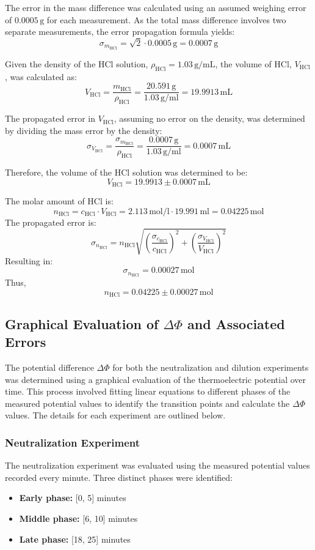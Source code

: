 \documentclass[a4paper,12pt]{article}
\begin{document}
The error in the mass difference was calculated using an assumed weighing error of \(0.0005 \, \text{g}\) for each measurement. As the total mass difference involves two separate measurements, the error propagation formula yields:
\[
\sigma_{m_{\text{HCl}}} = \sqrt{2} \cdot 0.0005 \, \text{g} = 0.0007 \, \text{g}
\]

Given the density of the HCl solution, \( \rho_{\text{HCl}} = 1.03 \, \text{g/mL} \), the volume of HCl, \( V_{\text{HCl}} \), was calculated as:
\[
V_{\text{HCl}} = \frac{m_{\text{HCl}}}{\rho_{\text{HCl}}} = \frac{20.591 \,\si{\gram}}{1.03\,\si{\gram\per\milli\litre}} = 19.9913 \, \text{mL}
\]

The propagated error in \( V_{\text{HCl}} \), assuming no error on the density, was determined by dividing the mass error by the density:
\[
\sigma_{V_{\text{HCl}}} = \frac{\sigma_{m_{\text{HCl}}}}{\rho_{\text{HCl}}} = \frac{0.0007\,\si{\gram}}{1.03\,\si{\gram\per\milli\litre}} = 0.0007 \, \text{mL}
\]

Therefore, the volume of the HCl solution was determined to be:
\[
V_{\text{HCl}} = 19.9913 \pm 0.0007 \, \text{mL}
\]

The molar amount of HCl is:
\[
n_{\text{HCl}} = c_{\text{HCl}} \cdot V_{\text{HCl}} = 2.113 \,\si{\mol\per\litre}\cdot 19.991\,\si{\milli\litre} = 0.04225 \, \text{mol}
\]
The propagated error is:
\[
\sigma_{n_{\text{HCl}}} = n_{\text{HCl}} \sqrt{\left(\frac{\sigma_{c_{\text{HCl}}}}{c_{\text{HCl}}}\right)^2 + \left(\frac{\sigma_{V_{\text{HCl}}}}{V_{\text{HCl}}}\right)^2}
\]
Resulting in:
\[
\sigma_{n_{\text{HCl}}} = 0.00027 \, \text{mol}
\]
Thus,
\[
n_{\text{HCl}} = 0.04225 \pm 0.00027 \, \text{mol}
\]

\subsection{Graphical Evaluation of \(\Delta \Phi\) and Associated Errors}

The potential difference \(\Delta \Phi\) for both the neutralization and dilution experiments was determined using a graphical evaluation of the thermoelectric potential over time. This process involved fitting linear equations to different phases of the measured potential values to identify the transition points and calculate the \(\Delta \Phi\) values. The details for each experiment are outlined below.

\subsubsection{Neutralization Experiment}
The neutralization experiment was evaluated using the measured potential values recorded every minute. Three distinct phases were identified:
\begin{itemize}
    \item \textbf{Early phase:} [0, 5] minutes
    \item \textbf{Middle phase:} [6, 10] minutes
    \item \textbf{Late phase:} [18, 25] minutes
\end{itemize}
\end{document}
